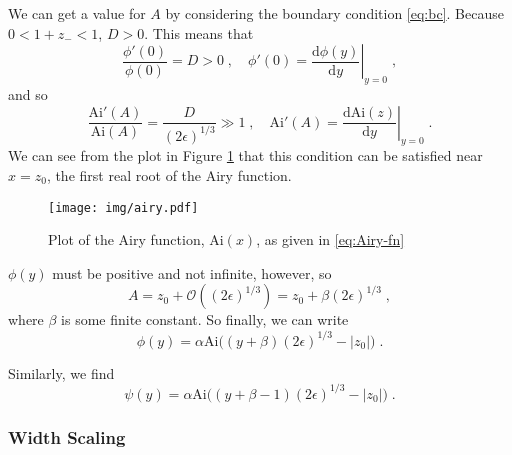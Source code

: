 \documentclass[a4paper,10pt]{article}
\newcommand{\D}{\mathrm{d}}
\newcommand{\Or}{\mathcal{O}}
\newcommand{\Ai}{\mathrm{Ai}}
\begin{document}
We can get a value for $A$ by considering the boundary condition \eqref{eq:bc}. Because $0 < 1+z_- < 1$, $D > 0$. This means that
\begin{equation}
 \frac{\phi'(0)}{\phi(0)} = D > 0 \;, \quad \phi'(0) = \left. \frac{\D \phi(y)}{\D y} \right|_{y=0} \;,
\end{equation}
and so
\begin{equation}
  \frac{\Ai'(A)}{\Ai(A)} = \frac{D}{(2\epsilon)^{1/3}} \gg 1 \;, \quad \Ai'(A) = \left. \frac{\D \Ai(z)}{\D y} \right|_{y=0} \;.
\end{equation}
We can see from the plot in Figure \ref{fig:Airy-fn} that this condition can be satisfied near $x=z_0$, the first real root of the Airy function.
\begin{figure}[h!]
  \centering
  \texttt{[image: img/airy.pdf]}
  \caption{Plot of the Airy function, $\Ai(x)$, as given in \eqref{eq:Airy-fn}}
  \label{fig:Airy-fn}
\end{figure}
$\phi(y)$ must be positive and not infinite, however, so
\begin{equation}
  A = z_0 + \Or( (2\epsilon)^{1/3} )  = z_0 + \beta (2\epsilon)^{1/3} \;,
\end{equation}
where $\beta$ is some finite constant. So finally, we can write
\begin{equation}\label{eq:phi_y}
  \phi(y) = \alpha \Ai \bigg( (y+\beta)(2\epsilon)^{1/3} - |z_0| \bigg) \;. 
\end{equation}

Similarly, we find
\begin{equation}\label{eq:psi_y}
 \psi(y) = \alpha \Ai \bigg( (y+\beta-1)(2\epsilon)^{1/3} - |z_0| \bigg) \;. 
\end{equation}

\subsubsection{Width Scaling}
\end{document}

